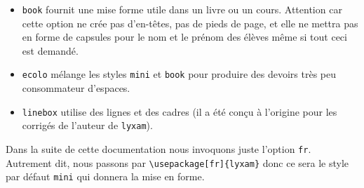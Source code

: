 \documentclass[12pt,a4paper]{scrartcl}
\begin{document}
\begin{itemize}
\begin{itemize}[label=--]
        \item \verb+book+ fournit une mise forme utile dans un livre ou un cours. Attention car cette option ne crée pas d'en-têtes, pas de pieds de page, et elle ne mettra pas en forme de capsules pour le nom et le prénom des élèves même si tout ceci est demandé.
        
        \item \verb+ecolo+ mélange les styles \verb+mini+ et \verb+book+ pour produire des devoirs très peu consommateur d'espaces.
        
        \item \verb+linebox+ utilise des lignes et des cadres (il a été conçu à l'origine pour les corrigés de l'auteur de \verb+lyxam+).
    \end{itemize}
\end{itemize}


\begin{remark*}
	Dans la suite de cette documentation nous invoquons juste l'option \verb+fr+.
	Autrement dit, nous passons par \verb+\usepackage[fr]{lyxam}+ donc ce sera le style par défaut \verb+mini+ qui donnera la mise en forme.
\end{remark*}
\end{document}
